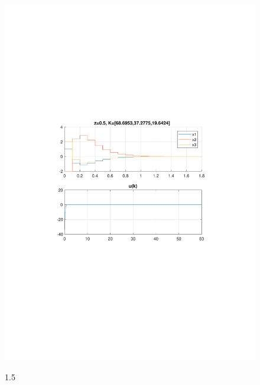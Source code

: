 \documentclass{article}
\begin{document}
{\begin{figure}[H]
\includegraphics[clip, trim=0.5cm 9.5cm 0.5cm 9.5cm, width=1.00\textwidth]{../rys/zad3_rys5.pdf}
\label{fig:rys3.1.5}
\caption{1.5}
\end{figure}
}
\end{document}
